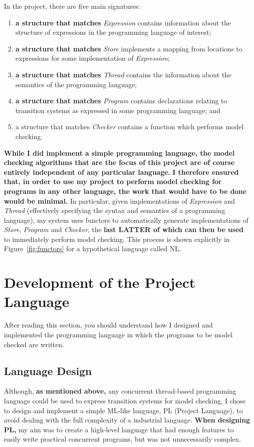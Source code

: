 \documentclass[12pt,a4paper,twoside,openright]{report}
\begin{document}
In the project, there are five main signatures:
\begin{enumerate}
	\item \textbf{a structure that matches} \emph{Expression}
	contains information about the structure of expressions
	in the programming language of interest;
	\item \textbf{a structure that matches} \emph{Store}
	implements a mapping from locations
	to expressions for some implementation of \emph{Expression};
	\item \textbf{a structure that matches} \emph{Thread} contains
	the information about the semantics
	of the programming language;
	\item \textbf{a structure that matches} \emph{Program}
	contains declarations relating to
	transition systems as expressed in some programming
	language; and
	\item a structure that matches \emph{Checker}
	contains a function which performs model checking.
\end{enumerate}

\textbf{While I did implement a simple programming language,
the model checking
algorithms that are the focus of this project are of
course entirely independent of any particular language.}
\textbf{I therefore ensured that, in order to use
my project to perform model checking for programs
in any other language, the work that would have to
be done would be minimal.} In particular, given implementations
of \emph{Expression} and \emph{Thread} (effectively
specifying the syntax and semantics of a programming
language), my system uses
functors to automatically generate implementations of
\emph{Store}, \emph{Program} and \emph{Checker}, the
\textbf{last LATTER of which can then be used} to immediately perform
model checking. This process is shown explicitly in
Figure~\ref{fig:functors} for
a hypothetical language called NL.

\section{Development of the Project Language}
\label{sec:language}
After reading this section, you should
understand how I designed
and implemented the programming
language in which the programs to
be model checked are written.

\subsection{Language Design}
Although, \textbf{as mentioned above,} any concurrent
thread-based programming language
could be used to express transition systems for model
checking, I chose to design and implement a simple
ML-like language, PL (Project Language), to avoid
dealing with the full complexity of a
industrial language. \textbf{When designing PL,} my aim
was to create a high-level language that had enough features
to easily write practical concurrent programs,
but was not unnecessarily complex.
\end{document}
